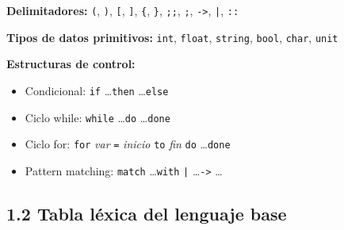 \documentclass[12pt,a4paper]{article}
\begin{document}
\textbf{Delimitadores:}
\texttt{(}, \texttt{)}, \texttt{[}, \texttt{]}, \texttt{\{}, \texttt{\}},
\texttt{;;}, \texttt{;}, \texttt{->}, \texttt{|}, \texttt{::}

\textbf{Tipos de datos primitivos:}
\texttt{int}, \texttt{float}, \texttt{string}, \texttt{bool}, \texttt{char}, \texttt{unit}

\textbf{Estructuras de control:}
\begin{itemize}
  \item Condicional: \texttt{if} \ldots \texttt{then} \ldots \texttt{else}
  \item Ciclo while: \texttt{while} \ldots \texttt{do} \ldots \texttt{done}
  \item Ciclo for: \texttt{for} \textit{var} \texttt{=} \textit{inicio} \texttt{to} \textit{fin} \texttt{do} \ldots \texttt{done}
  \item Pattern matching: \texttt{match} \ldots \texttt{with} \texttt{|} \ldots \texttt{->} \ldots
\end{itemize}

\subsection*{1.2 Tabla léxica del lenguaje base}
\end{document}
